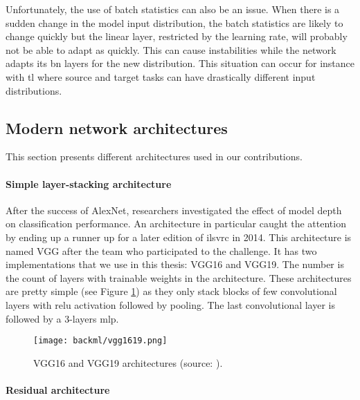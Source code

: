 Unfortunately, the use of batch statistics can also be an issue. When there is a
sudden change in the model input distribution, the batch statistics are likely to
change quickly but the linear layer, restricted by the learning rate, will probably
not be able to adapt as quickly. This can cause instabilities while the network
adapts its \acrlong{bn} layers for the new distribution. This situation can occur
for instance with \acrlong{tl} where source and target tasks can have drastically
different input distributions.

\subsection{Modern network architectures}
\label{ssec:backml:dl:modernarchi}

This section presents different architectures used in our contributions.

\paragraph{Simple layer-stacking architecture}
\label{sssec:backml:arch:layerstacking}
After the success of AlexNet, researchers investigated the effect of model depth
on classification performance. An architecture in particular caught the attention
by ending up a runner up for a later edition of \acrshort{ilsvrc} in 2014. This
architecture is named VGG \cite{simonyan2014very} after the team who participated
to the challenge. It has two implementations that we use in this thesis: VGG16 and VGG19.
The number is the count of layers with trainable weights in the architecture.
These architectures are pretty simple (see Figure \ref{fig:backml:vgg})
as they only stack blocks of few convolutional layers with \acrshort{relu} activation
followed by pooling. The last convolutional layer is followed by a 3-layers
\acrshort{mlp}.

\begin{figure}
  \centering
  \texttt{[image: backml/vgg1619.png]}
  \caption{VGG16 and VGG19 architectures (source: \cite{img:vgg1619}).}
  \label{fig:backml:vgg}
\end{figure}

\paragraph{Residual architecture}
\label{sssec:backml:arch:residual}

